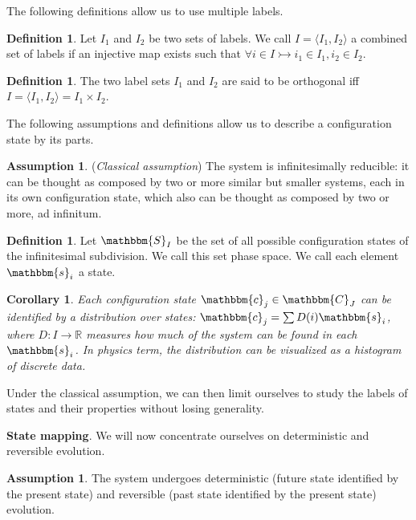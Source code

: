 \documentclass[twocolumn,floatfix,nofootinbib]{revtex4}   %
\theoremstyle{theorem}
\newtheorem{cor}[thm]{Corollary}
\theoremstyle{definition}
\newtheorem{defn}[thm]{Definition}
\newtheorem{assump}[thm]{Assumption}
\begin{document}
The following definitions allow us to use multiple labels.

\begin{defn}\label{combine label}
Let $I_1$ and $I_2$ be two sets of labels. We call $I = \langle I_1, I_2 \rangle$ a combined set of labels if an injective map exists such that $\forall i \in I \rightarrowtail i_1 \in I_1, i_2 \in I_2$.
\end{defn}

\begin{defn}\label{orth}
The two label sets $I_1$ and $I_2$ are said to be orthogonal iff $I = \langle I_1, I_2 \rangle = I_1 \times I_2$.
\end{defn}

The following assumptions and definitions allow us to describe a configuration state by its parts.

\begin{assump}\label{classical}
(\emph{Classical assumption}) The system is infinitesimally reducible: it can be thought as composed by two or more similar but smaller systems, each in its own configuration state, which also can be thought as composed by two or more, ad infinitum.
\end{assump}

\begin{defn}\label{statedef}
Let $\mathbbm{S}_I$ be the set of all possible configuration states of the infinitesimal subdivision. We call this set phase space. We call each element $\mathbbm{s}_i$ a state.
\end{defn}

\begin{cor}\label{statedistr}
Each configuration state $\mathbbm{c}_j \in \mathbbm{C}_J$ can be identified by a distribution over states: $\mathbbm{c}_j=\sum D(i) \mathbbm{s}_i$, where $D:I\rightarrow\mathbb{R}$ measures how much of the system can be found in each $\mathbbm{s}_i$. In physics term, the distribution can be visualized as a histogram of discrete data.
\end{cor}

Under the classical assumption, we can then limit ourselves to study the labels of states and their properties without losing generality.

\textbf{State mapping}. We will now concentrate ourselves on deterministic and reversible evolution.
\begin{assump}\label{detAss}
The system undergoes deterministic (future state identified by the present state) and reversible (past state identified by the present state) evolution.
\end{assump}
\end{document}
